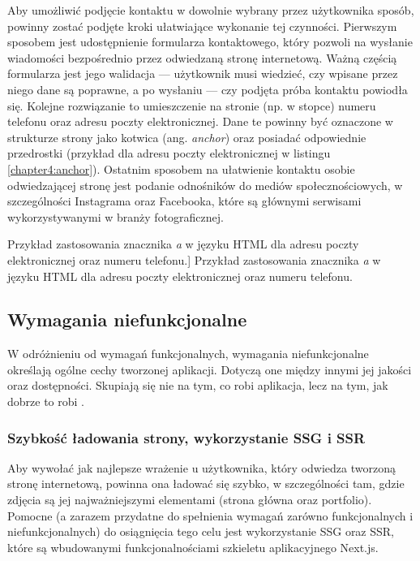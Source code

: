 \documentclass[a4paper, 12pt, twoside]{article}
\numberwithin{figure}{section}
\begin{document}
\begin{sloppypar}
Aby umożliwić podjęcie kontaktu w dowolnie wybrany przez użytkownika sposób, powinny zostać podjęte kroki ułatwiające wykonanie tej czynności. Pierwszym sposobem jest udostępnienie formularza kontaktowego, który pozwoli na wysłanie wiadomości bezpośrednio przez odwiedzaną stronę internetową. Ważną częścią formularza jest jego walidacja --- użytkownik musi wiedzieć, czy wpisane przez niego dane są poprawne, a po wysłaniu --- czy podjęta próba kontaktu powiodła się. Kolejne rozwiązanie to umieszczenie na stronie (np. w stopce) numeru telefonu oraz adresu poczty elektronicznej. Dane te powinny być oznaczone w strukturze strony jako kotwica (ang. \textit{anchor}) oraz posiadać odpowiednie przedrostki (przykład dla adresu poczty elektronicznej w listingu \ref{chapter4:anchor}). Ostatnim sposobem na ułatwienie kontaktu osobie odwiedzającej stronę jest podanie odnośników do mediów społecznościowych, w szczególności Instagrama oraz Facebooka, które są głównymi serwisami wykorzystywanymi w branży fotograficznej.

\begin{code}[htbp]
    \vspace{0.5cm}
    
    \caption
    [Przykład zastosowania znacznika \textit{a} w języku HTML dla adresu poczty elektronicznej oraz numeru telefonu.]
    {Przykład zastosowania znacznika \textit{a} w języku HTML dla adresu poczty elektronicznej oraz numeru telefonu.}
    \label{chapter4:anchor}
\end{code}



\subsection{Wymagania niefunkcjonalne}

W odróżnieniu od wymagań funkcjonalnych, wymagania niefunkcjonalne określają ogólne cechy tworzonej aplikacji. Dotyczą one między innymi jej jakości oraz dostępności. Skupiają się nie na tym, co robi aplikacja, lecz na tym, jak dobrze to robi \cite{wymagania}. 

\subsubsection*{Szybkość ładowania strony, wykorzystanie SSG i SSR}

Aby wywołać jak najlepsze wrażenie u użytkownika, który odwiedza tworzoną stronę internetową, powinna ona ładować się szybko, w szczególności tam, gdzie zdjęcia są jej najważniejszymi elementami (strona główna oraz portfolio). Pomocne (a zarazem przydatne do spełnienia wymagań zarówno funkcjonalnych i niefunkcjonalnych) do osiągnięcia tego celu jest wykorzystanie SSG oraz SSR, które są wbudowanymi funkcjonalnościami szkieletu aplikacyjnego Next.js. 


\end{sloppypar}
\end{document}
